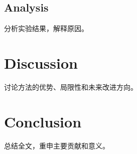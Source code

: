 \documentclass[12pt,a4paper]{article}
\begin{document}
\subsection{Analysis}
分析实验结果，解释原因。

\section{Discussion}
\label{sec:discussion}

讨论方法的优势、局限性和未来改进方向。

\section{Conclusion}
\label{sec:conclusion}

总结全文，重申主要贡献和意义。



\end{document}
